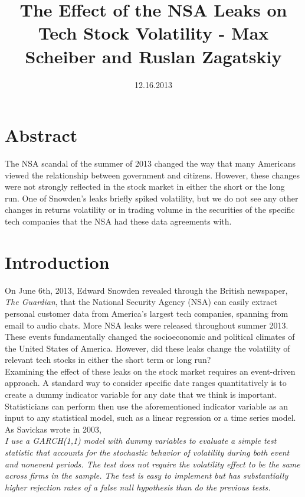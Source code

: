 \documentclass[11pt]{amsart}
\title{The Effect of the NSA Leaks on Tech Stock Volatility - Max Scheiber and Ruslan Zagatskiy}
\date{12.16.2013}
\begin{document}
\maketitle
\section{Abstract}
The NSA scandal of the summer of 2013 changed the way that many Americans viewed the relationship between government and citizens. However, these changes were not strongly reflected in the stock market in either the short or the long run. One of Snowden's leaks briefly spiked volatility, but we do not see any other changes in returns volatility or in trading volume in the securities of the specific tech companies that the NSA had these data agreements with. \\

\section{Introduction}
On June 6th, 2013, Edward Snowden revealed through the British newspaper, \textit{The Guardian}, that the National Security Agency (NSA) can easily extract personal customer data from America's largest tech companies, spanning from email to audio chats. More NSA leaks were released throughout summer 2013. These events fundamentally changed the socioeconomic and political climates of the United States of America. However, did these leaks change the volatility of relevant tech stocks in either the short term or long run? \\

Examining the effect of these leaks on the stock market requires an event-driven approach. A standard way to consider specific date ranges quantitatively is to create a dummy indicator variable for any date that we think is important. Statisticians can perform then use the aforementioned indicator variable as an input to any statistical model, such as a linear regression or a time series model. As Savickas wrote in 2003, \\

\textit{I use a GARCH(1,1) model with dummy variables to evaluate a simple test statistic that accounts for the stochastic behavior of volatility during both event and nonevent periods. The test does not require the volatility effect to be the same across firms in the sample. The test is easy to implement but has substantially higher rejection rates of a false null hypothesis than do the previous tests.} \\
\end{document}
